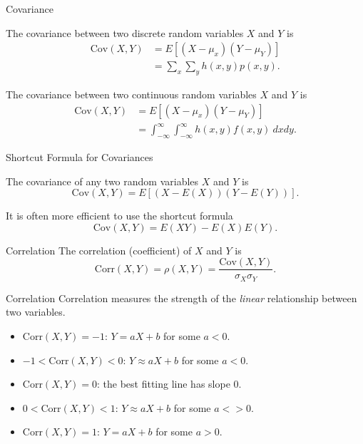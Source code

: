 \begin{frame}
  \begin{block}{Covariance}
  
      The covariance between two discrete random variables $X$ and $Y$ is
    \begin{align*}
      \mbox{Cov}(X,Y)
      &=E[(X-\mu_x)(Y-\mu_Y)]\\
      &=\sum_{x}\sum_{y}h(x,y)p(x,y).
    \end{align*}
    
    The covariance between two continuous random variables $X$ and $Y$ is
    \begin{align*}
      \mbox{Cov}(X,Y)
      &=E[(X-\mu_x)(Y-\mu_Y)]\\
      &=\int_{-\infty}^\infty \int_{-\infty}^\infty h(x,y) f(x,y)~dxdy.
    \end{align*}

  \end{block}
\end{frame}

\begin{frame}
  \begin{block}{Shortcut Formula for Covariances}
    
    The covariance of any two random variables $X$ and $Y$ is
    \[
      \mbox{Cov}(X,Y)=E[(X-E(X))(Y-E(Y))].
    \]
    
    \bigskip
    
    It is often more efficient to use the shortcut formula
    \[
      \mbox{Cov}(X,Y)=E(XY)-E(X)E(Y). 
    \]
    
  \end{block}
\end{frame}

\begin{frame}
  \begin{block}{Correlation}
    The correlation (coefficient) of $X$ and $Y$ is
    \[
      \mbox{Corr}(X,Y)=\rho(X,Y)=\frac{\mbox{Cov}(X,Y)}{\sigma_X\sigma_Y}.
    \]
  \end{block}
\end{frame}

\begin{frame}
  \begin{block}{Correlation}
    Correlation measures the strength of the \textit{linear} relationship between two variables.

    \bigskip

    \begin{itemize}
    \item $\mbox{Corr}(X,Y)=-1$: $Y=aX + b$ for some $a<0$.
    \item $-1<\mbox{Corr}(X,Y)<0$: $Y\approx aX + b$ for some $a<0$.
    \item $\mbox{Corr}(X,Y)=0$: the best fitting line has slope 0.
    \item $0<\mbox{Corr}(X,Y)<1$: $Y\approx aX + b$ for some $a<>0$.
    \item $\mbox{Corr}(X,Y)=1$: $Y=aX + b$ for some $a>0$.
    \end{itemize}

  \end{block}
\end{frame}


